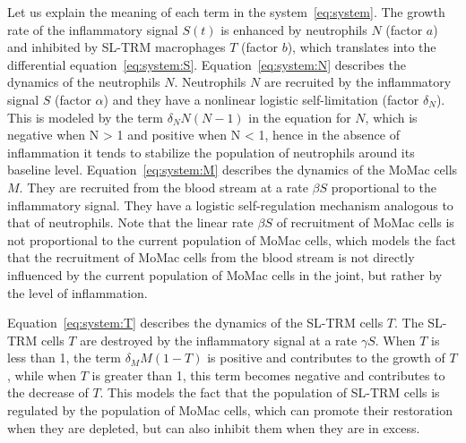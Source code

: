 \documentclass[a4paper, 12pt]{article}
\begin{document}
Let us explain the meaning of each term in the system~\eqref{eq:system}.
The growth rate of the inflammatory signal $S(t)$ is enhanced by neutrophils $N$ (factor $a$) and inhibited by SL-TRM macrophages $T$ (factor $b$), which translates into the differential equation~\eqref{eq:system:S}.
Equation~\eqref{eq:system:N} describes the dynamics of the neutrophils $N$.
 Neutrophils $N$ are recruited by the inflammatory signal $S$ (factor $\alpha$) and they have a nonlinear logistic self-limitation (factor $\delta_N$). This is modeled by the term $\delta_N N (N-1)$ in the equation for $N$,
which is negative when N > 1 and positive when N < 1, hence in the absence of inflammation it tends to stabilize the
population of neutrophils around its baseline level. 
Equation~\eqref{eq:system:M} describes the dynamics of the MoMac cells $M$. They are recruited from the blood stream at a  rate $\beta S$ proportional to the inflammatory signal. They have a logistic self-regulation mechanism analogous to that of neutrophils.
 Note that the linear rate $\beta S$ of recruitment of MoMac cells is not proportional to the current population of MoMac cells, which models the fact that the recruitment of MoMac cells from the blood stream is not directly influenced by the current population of MoMac cells in the joint, but rather by the level of inflammation.

Equation~\eqref{eq:system:T} describes the dynamics of the SL-TRM cells $T$. The SL-TRM cells $T$ are destroyed by the inflammatory signal at a rate $\gamma S$. When $T$ is less than 1, the term $\delta_M M (1-T)$ is positive and contributes to the growth of $T$, while when $T$ is greater than 1, this term becomes negative and contributes to the decrease of $T$. 
This models the fact that the population of SL-TRM cells is regulated by the population of MoMac cells, which can promote their restoration when they are depleted, but can also inhibit them when they are in excess. 
\end{document}
